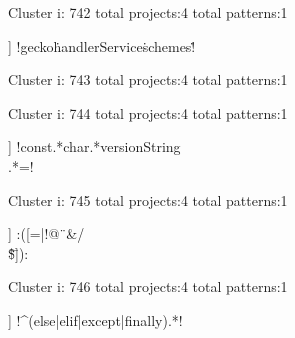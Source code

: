 Cluster i: 742
total projects:4
total patterns:1
\begin{multicols}{1}
\begin{description}[noitemsep,topsep=0pt]
\item [[4] ] \cverb!gecko\.handlerService\.schemes\.!
\end{description}
\end{multicols}







Cluster i: 743
total projects:4
total patterns:1
\begin{multicols}{1}
\end{multicols}







Cluster i: 744
total projects:4
total patterns:1
\begin{multicols}{1}
\begin{description}[noitemsep,topsep=0pt]
\item [[4] ] \cverb!const.*char.*versionString\[\].*=!
\end{description}
\end{multicols}







Cluster i: 745
total projects:4
total patterns:1
\begin{multicols}{1}
\begin{description}[noitemsep,topsep=0pt]
\item [[4] ] \cverb:([=\(\)|\-!@~\"&/\\\^\$\=]):
\end{description}
\end{multicols}







Cluster i: 746
total projects:4
total patterns:1
\begin{multicols}{1}
\begin{description}[noitemsep,topsep=0pt]
\item [[4] ] \cverb!^\s*(else|elif|except|finally).*\:!
\end{description}
\end{multicols}







